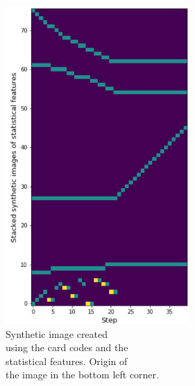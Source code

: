 \begin{minipage}{0.5\textwidth}
	\begin{figure}[H]
		\centering
		\includegraphics[width=7cm]{images/synImage.png}
		\caption[Bild kurz]{Synthetic image created \\\hspace{0\textwidth}using the card codes and the \\\hspace{0\textwidth}statistical features. Origin of \\\hspace{0\textwidth}the image in the bottom left corner.}
		\label{fig:synIm}
	\end{figure}
\end{minipage}

